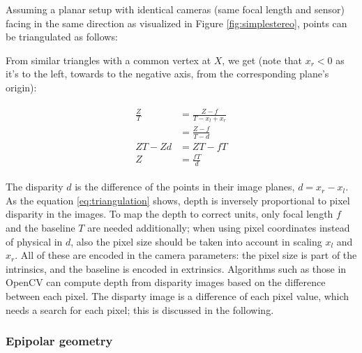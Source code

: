 Assuming a planar setup with identical cameras (same focal length and sensor) facing in the same direction as visualized in Figure \ref{fig:simplestereo}, points can be triangulated as follows:

From similar triangles with a common vertex at $X$, we get (note that $x_r < 0$ as it's to the left, towards to the negative axis, from the corresponding plane's origin):

\begin{align} \label{eq:triangulation} \begin{split}
	\frac{Z}{T} &= \frac{Z-f}{T - x_l + x_r} \\
	&= \frac{Z-f}{T - d}\\
	ZT - Zd &= ZT - fT\\
	Z &= \frac{fT}{d}
\end{split} \end{align}

The disparity $d$ is the difference of the points in their image planes, $d = x_r - x_l$.
As the equation \ref{eq:triangulation} shows, depth is inversely proportional to pixel disparity in the images.
To map the depth to correct units, only focal length $f$ and the baseline $T$ are needed additionally; when using pixel coordinates instead of physical in $d$, also the pixel size should be taken into account in scaling $x_l$ and $x_r$.
All of these are encoded in the camera parameters: the pixel size is part of the intrinsics, and the baseline is encoded in extrinsics.
Algorithms such as those in OpenCV \cite{opencv} can compute depth from disparity images based on the difference between each pixel.
The disparty image is a difference of each pixel value, which needs a search for each pixel;
this is discussed in the following.


\subsubsection{Epipolar geometry} %

